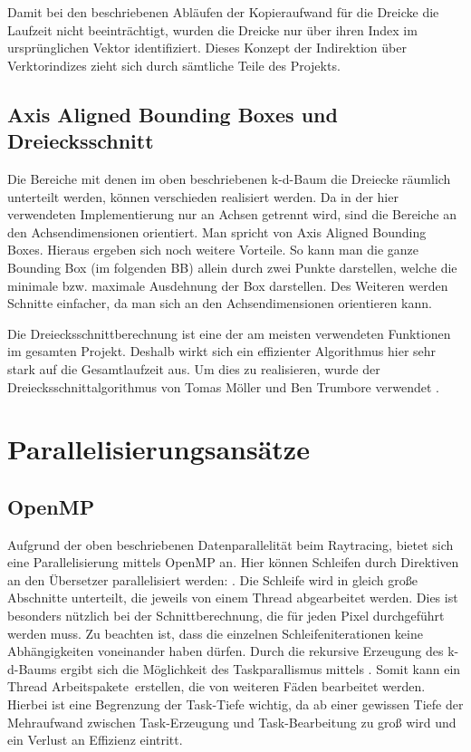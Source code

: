Damit bei den beschriebenen Abläufen der Kopieraufwand für die Dreicke die Laufzeit nicht beeinträchtigt, wurden die Dreicke nur über ihren Index im ursprünglichen Vektor identifiziert. Dieses Konzept der Indirektion über Verktorindizes zieht sich durch sämtliche Teile des Projekts.

\subsection{Axis Aligned Bounding Boxes und Dreiecksschnitt}
Die Bereiche mit denen im oben beschriebenen k-d-Baum die Dreiecke räumlich unterteilt werden, können verschieden realisiert werden. Da in der hier verwendeten Implementierung nur an Achsen getrennt wird, sind die Bereiche an den Achsendimensionen orientiert. Man spricht von Axis Aligned Bounding Boxes. Hieraus ergeben sich noch weitere Vorteile. So kann man die ganze Bounding Box (im folgenden \glqq BB\grqq) allein durch zwei Punkte darstellen, welche die minimale bzw. maximale Ausdehnung der Box darstellen. Des Weiteren werden Schnitte einfacher, da man sich an den Achsendimensionen orientieren kann.

Die Dreiecksschnittberechnung ist eine der am meisten verwendeten Funktionen im gesamten Projekt. Deshalb wirkt sich ein effizienter Algorithmus hier sehr stark auf die Gesamtlaufzeit aus. Um dies zu realisieren, wurde der Dreiecksschnittalgorithmus von Tomas Möller und Ben Trumbore verwendet \cite{moller2005fast}.  

\section{Parallelisierungsansätze}
\subsection{OpenMP}
\label{sec:openmp}
Aufgrund der oben beschriebenen Datenparallelität beim Raytracing, bietet sich eine Parallelisierung mittels OpenMP an. Hier können Schleifen durch Direktiven an den Übersetzer parallelisiert werden: . Die Schleife wird in gleich große Abschnitte unterteilt, die jeweils von einem Thread abgearbeitet werden. Dies ist besonders nützlich bei der Schnittberechnung, die für jeden Pixel durchgeführt werden muss. Zu beachten ist, dass die einzelnen Schleifeniterationen keine Abhängigkeiten voneinander haben dürfen.
Durch die rekursive Erzeugung des k-d-Baums ergibt sich die Möglichkeit des Taskparallismus mittels .
Somit kann ein Thread \glqq Arbeitspakete\grqq\ erstellen, die von weiteren Fäden bearbeitet werden. Hierbei ist eine Begrenzung der Task-Tiefe wichtig, da ab einer gewissen Tiefe der Mehraufwand zwischen Task-Erzeugung und Task-Bearbeitung zu groß wird und ein Verlust an Effizienz eintritt.

